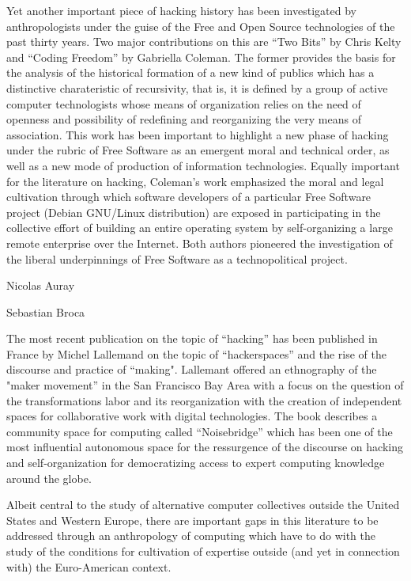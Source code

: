 \documentclass[10pt,letter,oneside]{scrartcl}
\begin{document}
Yet another important piece of hacking history has been investigated by anthropologists
under the guise of the Free and Open Source technologies of the past thirty 
years. Two major contributions on this are ``Two Bits'' by Chris Kelty and ``Coding 
Freedom'' by Gabriella Coleman. The former provides the basis for the analysis of 
the historical formation of a new kind of publics which has a distinctive
charateristic of recursivity, that is, it is defined by a group of active
computer technologists whose means of organization relies on the need of openness and
possibility of redefining and reorganizing the very means of association. This
work has been important to highlight a new phase of hacking under the rubric of
Free Software as an emergent moral and technical order, as well as a new
mode of production of information technologies. Equally important for the
literature on hacking, Coleman's work emphasized the moral and legal
cultivation through which software developers of a particular Free Software 
project (Debian GNU/Linux distribution) are exposed in participating in
the collective effort of building an entire operating system by self-organizing
a large remote enterprise over the Internet. Both authors pioneered the 
investigation of the liberal underpinnings of Free Software as a technopolitical 
project.

Nicolas Auray

Sebastian Broca

The most recent publication on the topic of ``hacking'' has been published in France
by Michel Lallemand on the topic of ``hackerspaces'' and the rise of the
discourse and practice of ``making". Lallemant offered an ethnography of the
"maker movement'' in the San Francisco Bay Area with a focus on the question of
the transformations labor and its reorganization with the creation of independent
spaces for collaborative work with digital technologies. The book describes a 
community space for computing called ``Noisebridge'' which has been one of the most 
influential autonomous space for the ressurgence of the discourse on
hacking and self-organization for democratizing access to expert computing
knowledge around the globe. 


Albeit central to the study of alternative computer collectives outside the
United States and Western Europe, there are important gaps in this literature
to be addressed through an anthropology of computing which have to do with the 
study of the conditions for cultivation of expertise outside (and yet in 
connection with) the Euro-American context.
\end{document}
